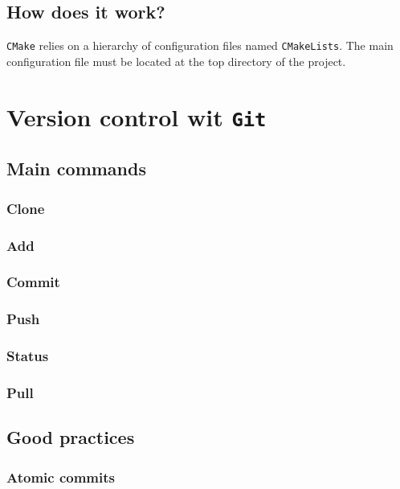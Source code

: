 \documentclass[12pt]{book}
\newcommand{\CMake}{\texttt{CMake}\xspace}
\newcommand{\CMakeLists}{\texttt{CMakeLists}\xspace}
\newcommand{\Git}{\texttt{Git}\xspace}
\begin{document}
\subsection{How does it work?}

\CMake relies on a hierarchy of configuration files named \CMakeLists. The main configuration file must be located at the top directory of the project.


\section{Version control wit \Git}


\subsection{Main commands}


\subsubsection{Clone}

\subsubsection{Add}

\subsubsection{Commit}


\subsubsection{Push}


\subsubsection{Status}


\subsubsection{Pull}


\subsection{Good practices}


\subsubsection{Atomic commits}
\end{document}
